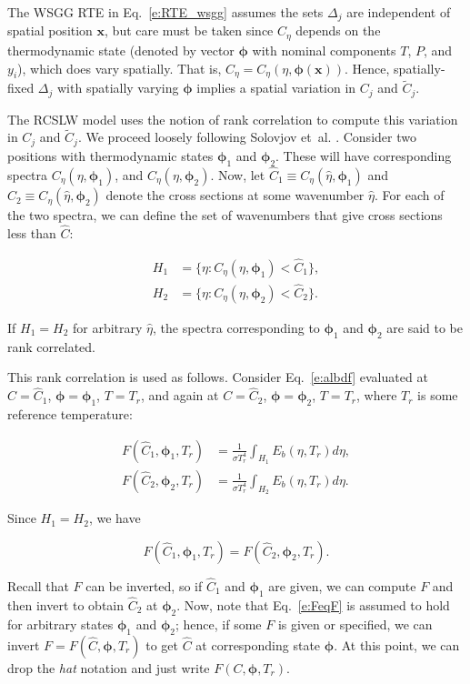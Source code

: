 \documentclass[preprint,12pt, a4paper]{elsarticle}
\newcommand{\BS}{\boldsymbol}
\begin{document}
The WSGG RTE in Eq.~\ref{e:RTE_wsgg} assumes the sets $\Delta_j$ are independent of spatial position $\mathbf{x}$, but care must be taken since $C_\eta$ depends on the thermodynamic state (denoted by vector $\BS{\phi}$ with nominal components $T$, $P$, and $y_i$), which does vary spatially. That is, $C_\eta=C_\eta(\eta,\BS{\phi}(\mathbf{x}))$. Hence, spatially-fixed $\Delta_j$ with spatially varying $\BS{\phi}$ implies a spatial variation in $C_j$ and $\tilde{C}_j$.
 
The RCSLW model uses the notion of rank correlation to compute this variation in $C_j$ and $\tilde{C}_j$. 
We proceed loosely following Solovjov et~al. \cite{Solovjov_2014}.
Consider two positions with thermodynamic states $\BS{\phi}_1$ and $\BS{\phi}_2$. These will have corresponding spectra $C_\eta(\eta,\BS{\phi}_1)$, and $C_\eta(\eta,\BS{\phi}_2)$.
Now, let $\hat{C}_1\equiv C_\eta(\hat{\eta},\BS{\phi}_1)$ and $\hat{C}_2\equiv C_\eta(\hat{\eta},\BS{\phi}_2)$ denote the cross sections at some wavenumber $\hat{\eta}$. For each of the two spectra, we can define the set of wavenumbers that give cross sections less than $\hat{C}$:
%
\begin{linenomath}
\begin{align}
    H_1&=\{\eta: C_\eta(\eta,\BS{\phi}_1)<\hat{C}_1\}, \\
    H_2&=\{\eta: C_\eta(\eta,\BS{\phi}_2)<\hat{C}_2\}.
    \end{align}
\end{linenomath}
%
If $H_1=H_2$ for arbitrary $\hat{\eta}$, the spectra corresponding to $\BS{\phi}_1$ and $\BS{\phi}_2$ are said to be rank correlated.

This rank correlation is used as follows. Consider Eq.~\ref{e:albdf} evaluated at $C=\hat{C}_1$, $\BS{\phi}=\BS{\phi}_1$, $T=T_r$, and again at
$C=\hat{C}_2$, $\BS{\phi}=\BS{\phi}_2$, $T=T_r$, where $T_r$ is some reference temperature:
%
\begin{linenomath}
    \begin{align} \label{e:albdf2}
        F(\hat{C}_1,\BS{\phi}_1,T_r) &= \frac{1}{\sigma T_r^4}\int_{H_1}E_b(\eta,T_r)d\eta, \\
        F(\hat{C}_2,\BS{\phi}_2,T_r) &= \frac{1}{\sigma T_r^4}\int_{H_2}E_b(\eta,T_r)d\eta.
    \end{align}
\end{linenomath}
%
Since $H_1=H_2$, we have 
%
\begin{linenomath}
    \begin{equation}\label{e:FeqF}
    F(\hat{C}_1,\BS{\phi}_1,T_r)=F(\hat{C}_2,\BS{\phi}_2,T_r).
\end{equation}
\end{linenomath}
%
Recall that $F$ can be inverted, so if $\hat{C}_1$ and $\BS{\phi}_1$ are given, we can compute $F$ and then invert to obtain $\hat{C}_2$ at $\BS{\phi}_2$. Now, note that Eq.~\ref{e:FeqF} is assumed to hold for arbitrary states $\BS{\phi}_1$ and $\BS{\phi}_2$; hence, if some $F$ is given or specified, we can invert $F=F(\hat{C},\BS{\phi},T_r)$ to get $\hat{C}$ at corresponding state $\BS{\phi}$. At this point, we can drop the \emph{hat} notation and just write $F(C,\BS{\phi},T_r)$.
\end{document}
